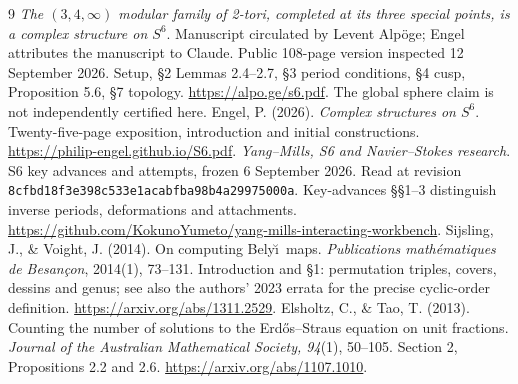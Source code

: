 \begin{thebibliography}{9}
\emph{The $(3,4,\infty)$ modular family of 2-tori, completed at its three
special points, is a complex structure on $S^6$}. Manuscript circulated
by Levent Alp\"oge; Engel attributes the manuscript to Claude.
Public 108-page version inspected 12 September 2026.
Setup, \S2 Lemmas 2.4--2.7, \S3 period conditions, \S4 cusp,
Proposition 5.6, \S7 topology. \url{https://alpo.ge/s6.pdf}.
The global sphere claim is not independently certified here.
Engel, P. (2026). \emph{Complex structures on $S^6$}.
Twenty-five-page exposition, introduction and initial constructions.
\url{https://philip-engel.github.io/S6.pdf}.
\emph{Yang--Mills, S6 and Navier--Stokes research}. S6 key advances and
attempts, frozen 6 September 2026. Read at revision
\texttt{8cfbd18f3e398c533e1acabfba98b4a29975000a}.
Key-advances \S\S1--3 distinguish inverse periods, deformations and attachments.
\url{https://github.com/KokunoYumeto/yang-mills-interacting-workbench}.
Sijsling, J., \& Voight, J. (2014). On computing Bely\u\i\ maps.
\emph{Publications math\'ematiques de Besan\c con}, 2014(1), 73--131.
Introduction and \S1: permutation triples, covers, dessins and genus;
see also the authors' 2023 errata for the precise cyclic-order definition.
\url{https://arxiv.org/abs/1311.2529}.
Elsholtz, C., \& Tao, T. (2013). Counting the number of solutions to the
Erd\H{o}s--Straus equation on unit fractions.
\emph{Journal of the Australian Mathematical Society, 94}(1), 50--105.
Section 2, Propositions 2.2 and 2.6.
\url{https://arxiv.org/abs/1107.1010}.
\end{thebibliography}
